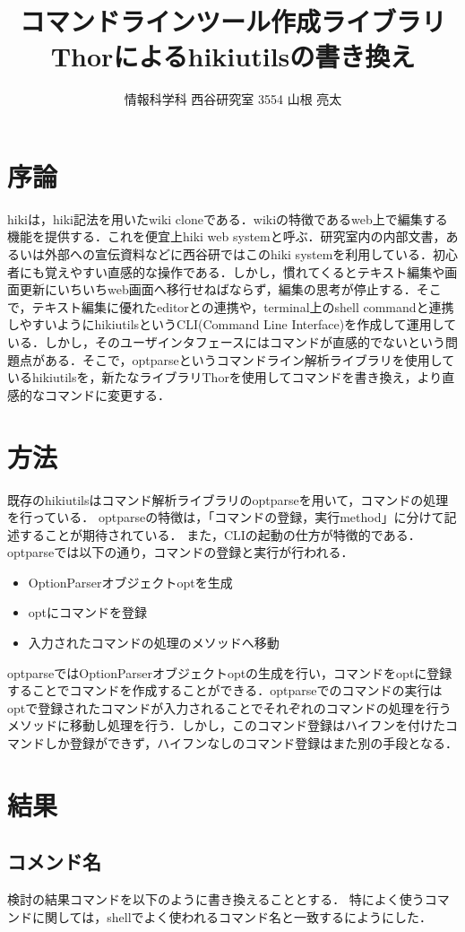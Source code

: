 \documentclass[a4j,twocolumn]{jsarticle}
\begin{document}
\title{コマンドラインツール作成ライブラリThorによるhikiutilsの書き換え}
\author{情報科学科 西谷研究室 3554 山根 亮太}
\date{}
\maketitle
\section{序論}
hikiは，hiki記法を用いたwiki cloneである．wikiの特徴であるweb上で編集する機能を提供する．これを便宜上hiki web systemと呼ぶ．研究室内の内部文書，あるいは外部への宣伝資料などに西谷研ではこのhiki systemを利用している．初心者にも覚えやすい直感的な操作である．しかし，慣れてくるとテキスト編集や画面更新にいちいちweb画面へ移行せねばならず，編集の思考が停止する．そこで，テキスト編集に優れたeditorとの連携や，terminal上のshell commandと連携しやすいようにhikiutilsというCLI(Command Line Interface)を作成して運用している．しかし，そのユーザインタフェースにはコマンドが直感的でないという問題点がある．そこで，optparseというコマンドライン解析ライブラリを使用しているhikiutilsを，新たなライブラリThorを使用してコマンドを書き換え，より直感的なコマンドに変更する．

\section{方法}
既存のhikiutilsはコマンド解析ライブラリのoptparseを用いて，コマンドの処理を行っている．
optparseの特徴は，「コマンドの登録，実行method」に分けて記述することが期待されている．
また，CLIの起動の仕方が特徴的である．
optparseでは以下の通り，コマンドの登録と実行が行われる．
\begin{itemize}
\item OptionParserオブジェクトoptを生成
\item optにコマンドを登録
\item 入力されたコマンドの処理のメソッドへ移動
\end{itemize}
optparseではOptionParserオブジェクトoptの生成を行い，コマンドをoptに登録することでコマンドを作成することができる．optparseでのコマンドの実行はoptで登録されたコマンドが入力されることでそれぞれのコマンドの処理を行うメソッドに移動し処理を行う．しかし，このコマンド登録はハイフンを付けたコマンドしか登録ができず，ハイフンなしのコマンド登録はまた別の手段となる．
\section{結果}
\subsection{コメンド名}
検討の結果コマンドを以下のように書き換えることとする．
特によく使うコマンドに関しては，shellでよく使われるコマンド名と一致するにようにした．
\end{document}
